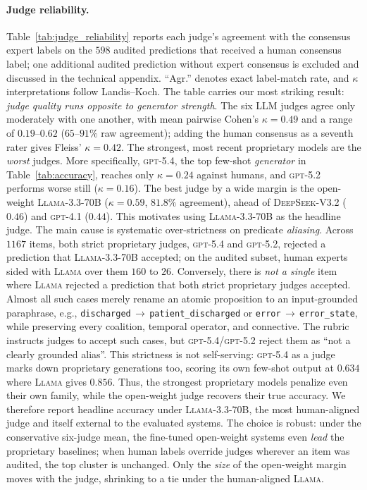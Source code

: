 \paragraph{Judge reliability.}
{\sloppy\setlength{\emergencystretch}{3em}
Table~\ref{tab:judge_reliability} reports each judge's agreement with the consensus expert labels on the $598$ audited predictions that received a human consensus label; one additional audited prediction without expert consensus is excluded and discussed in the technical appendix. ``Agr.'' denotes exact label-match rate, and $\kappa$ interpretations follow Landis--Koch. The table carries our most striking result: \emph{judge quality runs opposite to generator strength}. The six LLM judges agree only moderately with one another, with mean pairwise Cohen's $\kappa=0.49$ and a range of $0.19$--$0.62$ ($65$--$91\%$ raw agreement); adding the human consensus as a seventh rater gives Fleiss' $\kappa=0.42$. The strongest, most recent proprietary models are the \emph{worst} judges. More specifically, \textsc{gpt-5.4}, the top few-shot \emph{generator} in Table~\ref{tab:accuracy}, reaches only $\kappa=0.24$ against humans, and \textsc{gpt-5.2} performs worse still ($\kappa=0.16$). The best judge by a wide margin is the open-weight \textsc{Llama-3.3-70B} ($\kappa=0.59$, $81.8\%$ agreement), ahead of \textsc{DeepSeek-V3.2} ($0.46$) and \textsc{gpt-4.1} ($0.44$). This motivates using \textsc{Llama-3.3-70B} as the headline judge. The main cause is systematic over-strictness on predicate \emph{aliasing}. Across $1167$ items, both strict proprietary judges, \textsc{gpt-5.4} and \textsc{gpt-5.2}, rejected a prediction that \textsc{Llama-3.3-70B} accepted; on the audited subset, human experts sided with \textsc{Llama} over them $160$ to $26$. Conversely, there is \emph{not a single} item where \textsc{Llama} rejected a prediction that both strict proprietary judges accepted. Almost all such cases merely rename an atomic proposition to an input-grounded paraphrase, e.g., \texttt{discharged}\,$\to$\,\texttt{patient\_discharged} or \texttt{error}\,$\to$\,\texttt{error\_state}, while preserving every coalition, temporal operator, and connective. The rubric instructs judges to accept such cases, but \textsc{gpt-5.4}/\textsc{gpt-5.2} reject them as ``not a clearly grounded alias''. This strictness is not self-serving: \textsc{gpt-5.4} as a judge marks down proprietary generations too, scoring its own few-shot output at $0.634$ where \textsc{Llama} gives $0.856$. Thus, the strongest proprietary models penalize even their own family, while the open-weight judge recovers their true accuracy. We therefore report headline accuracy under \textsc{Llama-3.3-70B}, the most human-aligned judge and itself external to the evaluated systems. The choice is robust: under the conservative six-judge mean, the fine-tuned open-weight systems even \emph{lead} the proprietary baselines; when human labels override judges wherever an item was audited, the top cluster is unchanged. Only the \emph{size} of the open-weight margin moves with the judge, shrinking to a tie under the human-aligned \textsc{Llama}.
\par}

